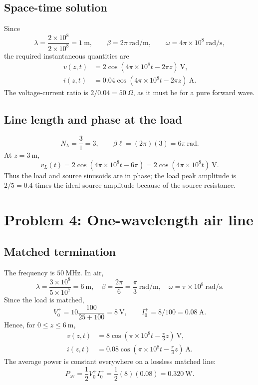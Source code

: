 \documentclass[12pt,a4paper]{article}
\begin{document}
\subsection{Space-time solution}

Since
\[
\lambda=\frac{2\times10^8}{2\times10^8}=1~\mathrm{m},
\qquad \beta=2\pi~\mathrm{rad/m},
\qquad \omega=4\pi\times10^8~\mathrm{rad/s},
\]
the required instantaneous quantities are
\begin{align}
v(z,t)&=2\cos(4\pi\times10^8t-2\pi z)~\mathrm{V},\\
i(z,t)&=0.04\cos(4\pi\times10^8t-2\pi z)~\mathrm{A}.
\end{align}
The voltage-current ratio is $2/0.04=50~\Omega$, as it must be for a pure
forward wave.

\subsection{Line length and phase at the load}

\[
N_\lambda=\frac{3}{1}=3,
\qquad
\beta\ell=(2\pi)(3)=6\pi~\mathrm{rad}.
\]
At $z=3~\mathrm{m}$,
\[
v_L(t)=2\cos(4\pi\times10^8t-6\pi)
=2\cos(4\pi\times10^8t)~\mathrm{V}.
\]
Thus the load and source sinusoids are in phase; the load peak amplitude is
$2/5=0.4$ times the ideal source amplitude because of the source resistance.


\section{Problem 4: One-wavelength air line}


\subsection{Matched termination}

The frequency is $50~\mathrm{MHz}$.  In air,
\[
\lambda=\frac{3\times10^8}{5\times10^7}=6~\mathrm{m},
\quad
\beta=\frac{2\pi}{6}=\frac{\pi}{3}~\mathrm{rad/m},
\quad
\omega=\pi\times10^8~\mathrm{rad/s}.
\]
Since the load is matched,
\[
V_0^+=10\frac{100}{25+100}=8~\mathrm{V},
\qquad I_0^+=8/100=0.08~\mathrm{A}.
\]
Hence, for $0\le z\le6~\mathrm{m}$,
\begin{align}
v(z,t)&=8\cos\left(\pi\times10^8t-\frac{\pi}{3}z\right)~\mathrm{V},\\
i(z,t)&=0.08\cos\left(\pi\times10^8t-\frac{\pi}{3}z\right)~\mathrm{A}.
\end{align}
The average power is constant everywhere on a lossless matched line:
\begin{equation}
P_{\mathrm{av}}=\frac{1}{2}V_0^+I_0^+
=\frac{1}{2}(8)(0.08)=0.320~\mathrm{W}.
\end{equation}
\end{document}
